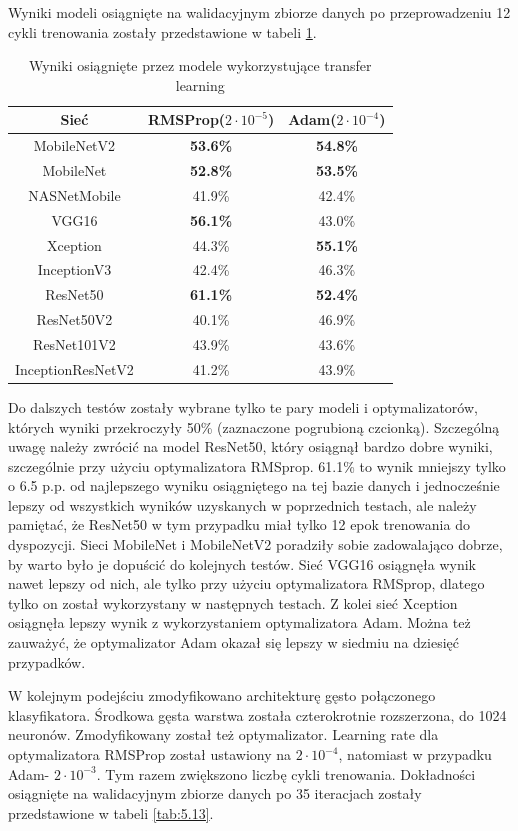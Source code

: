 Wyniki modeli osiągnięte na walidacyjnym zbiorze danych po przeprowadzeniu 12 cykli trenowania zostały przedstawione w tabeli \ref{tab:5.12}.

\begin{table}[H]
  \centering
  \caption{Wyniki osiągnięte przez modele wykorzystujące transfer learning}
    \begin{tabular}{ |c|c|c| }
    \hline
    Sieć & RMSProp($2\cdot10^{-5}$) & Adam($2\cdot10^{-4}$) \\
    \hline
    MobileNetV2 & \textbf{53.6\%} & \textbf{54.8\%} \\ 
    MobileNet & \textbf{52.8\%} & \textbf{53.5\%} \\ 
    NASNetMobile & 41.9\% & 42.4\% \\
    VGG16 & \textbf{56.1\%} & 43.0\% \\
    Xception & 44.3\% & \textbf{55.1\%} \\ 
    InceptionV3 & 42.4\% & 46.3\% \\
    ResNet50 & \textbf{61.1\%} & \textbf{52.4\%} \\ 
    ResNet50V2 & 40.1\% & 46.9\% \\
    ResNet101V2 & 43.9\% & 43.6\% \\ 
    InceptionResNetV2 &  41.2\% & 43.9\% \\
    \hline
    \end{tabular}
  \label{tab:5.12}
\end{table}

Do dalszych testów zostały wybrane tylko te pary modeli i optymalizatorów, których wyniki przekroczyły 50\% (zaznaczone pogrubioną czcionką). Szczególną uwagę należy zwrócić na model ResNet50, który osiągnął bardzo dobre wyniki, szczególnie przy użyciu optymalizatora RMSprop. 61.1\% to wynik mniejszy tylko o 6.5 p.p. od najlepszego wyniku osiągniętego na tej bazie danych i jednocześnie lepszy od wszystkich wyników uzyskanych w poprzednich testach, ale należy pamiętać, że ResNet50 w tym przypadku miał tylko 12 epok trenowania do dyspozycji. Sieci MobileNet i MobileNetV2 poradziły sobie zadowalająco dobrze, by warto było je dopuścić do kolejnych testów. Sieć VGG16 osiągnęła wynik nawet lepszy od nich, ale tylko przy użyciu optymalizatora RMSprop, dlatego tylko on został wykorzystany w następnych testach. Z kolei sieć Xception osiągnęła lepszy wynik z wykorzystaniem optymalizatora Adam. Można też zauważyć, że optymalizator Adam okazał się lepszy w siedmiu na dziesięć przypadków.

W kolejnym podejściu zmodyfikowano architekturę gęsto połączonego klasyfikatora. Środkowa gęsta warstwa została czterokrotnie rozszerzona, do 1024 neuronów. Zmodyfikowany został też optymalizator. Learning rate dla optymalizatora RMSProp został ustawiony na $2\cdot10^{-4}$, natomiast w przypadku Adam- $2\cdot10^{-3}$. Tym razem zwiększono liczbę cykli trenowania. Dokładności osiągnięte na walidacyjnym zbiorze danych po 35 iteracjach zostały przedstawione w tabeli \ref{tab:5.13}.

